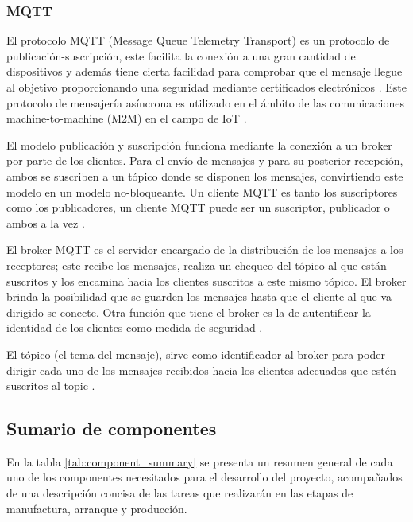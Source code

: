 \documentclass{article}
\begin{document}
            \subsubsection{MQTT}

                El protocolo MQTT (Message Queue Telemetry Transport) es un protocolo de publicación-suscripción, este facilita la conexión a una gran cantidad de dispositivos y además tiene cierta facilidad para comprobar que el mensaje llegue al objetivo proporcionando una seguridad mediante certificados electrónicos \cite{lliso2021uso}. Este protocolo de mensajería asíncrona es utilizado en el ámbito de las comunicaciones machine-to-machine (M2M) en el campo de IoT \cite{mahedero2020desarrollo}.

                El modelo publicación y suscripción funciona mediante la conexión a un broker por parte de los clientes. Para el envío de mensajes y para su posterior recepción, ambos se suscriben a un tópico donde se disponen los mensajes, convirtiendo este modelo en un modelo no-bloqueante. Un cliente MQTT es tanto los suscriptores como los publicadores, un cliente MQTT puede ser un suscriptor, publicador o ambos a la vez \cite{mahedero2020desarrollo}.

                El broker MQTT es el servidor encargado de la distribución de los mensajes a los receptores; este recibe los mensajes, realiza un chequeo del tópico al que están suscritos y los encamina hacia los clientes suscritos a este mismo tópico. El broker brinda la posibilidad que se guarden los mensajes hasta que el cliente al que va dirigido se conecte. Otra función que tiene el broker es la de autentificar la identidad de los clientes como medida de seguridad \cite{mahedero2020desarrollo}.

                El tópico (el tema del mensaje), sirve como identificador al broker para poder dirigir cada uno de los mensajes recibidos hacia los clientes adecuados que estén suscritos al topic \cite{mahedero2020desarrollo}.

        \subsection{Sumario de componentes}

            En la tabla \ref{tab:component_summary} se presenta un resumen general de cada uno de los componentes necesitados para el desarrollo del proyecto, acompañados de una descripción concisa de las tareas que realizarán en las etapas de manufactura, arranque y producción.
\end{document}
